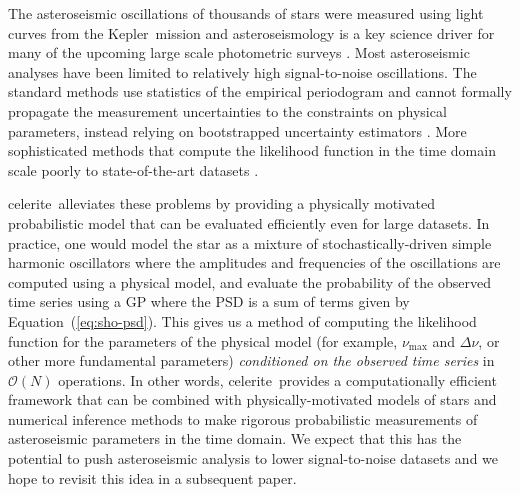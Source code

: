 \documentclass[manuscript, letterpaper]{aastex6}
\makeatletter
\let\origsubsection\subsection
\renewcommand\subsection{\@ifstar{\starsubsection}{\nostarsubsection}}
\newcommand\nostarsubsection[1]{\subsectionprelude\origsubsection{#1}}
\newcommand\starsubsection[1]{\subsectionprelude\origsubsection*{#1}}
\newcommand\subsectionprelude{\vspace{1em}}
\newcommand{\project}[1]{\textsf{#1}}
\newcommand{\kepler}{\project{Kepler}}
\newcommand{\celerite}{\project{celerite}}
\renewcommand{\eqref}[1]{\ref{eq:#1}}
\newcommand{\Eq}[1]{Equation~(\eqref{#1})}
\newcommand{\eq}[1]{\Eq{#1}}
\makeatother
\begin{document}
\subsection{Asteroseismic oscillations}

The asteroseismic oscillations of thousands of stars were measured using light
curves from the \kepler\ mission \citep{Gilliland:2010, Huber:2011,
Chaplin:2011, Chaplin:2013, Stello:2013} and asteroseismology is a key science
driver for many of the upcoming large scale photometric surveys
\citep{Campante:2016, Rauer:2014, Gould:2015}.
Most asteroseismic analyses have been limited to relatively high
signal-to-noise oscillations.
The standard methods use statistics of the empirical periodogram and cannot
formally propagate the measurement uncertainties to the constraints on
physical parameters, instead relying on bootstrapped uncertainty estimators
\citep{Huber:2009}.
More sophisticated methods that compute the likelihood function in the time
domain scale poorly to state-of-the-art datasets \citep{Brewer:2009,
Corsaro:2014}.

\celerite\ alleviates these problems by providing a physically motivated
probabilistic model that can be evaluated efficiently even for large datasets.
In practice, one would model the star as a mixture of stochastically-driven
simple harmonic oscillators where the amplitudes and frequencies of the
oscillations are computed using a physical model, and evaluate the probability
of the observed time series using a GP where the PSD is a sum of terms given
by \eq{sho-psd}.
This gives us a method of computing the likelihood function for the parameters
of the physical model (for example, $\nu_\mathrm{max}$ and $\Delta \nu$, or
other more fundamental parameters) \emph{conditioned on the observed time
series} in $\mathcal{O}(N)$ operations.
In other words, \celerite\ provides a computationally efficient framework that
can be combined with physically-motivated models of stars and numerical
inference methods to make rigorous probabilistic measurements of asteroseismic
parameters in the time domain.
We expect that this has the potential to push asteroseismic analysis to lower
signal-to-noise datasets and we hope to revisit this idea in a subsequent
paper.
\end{document}
